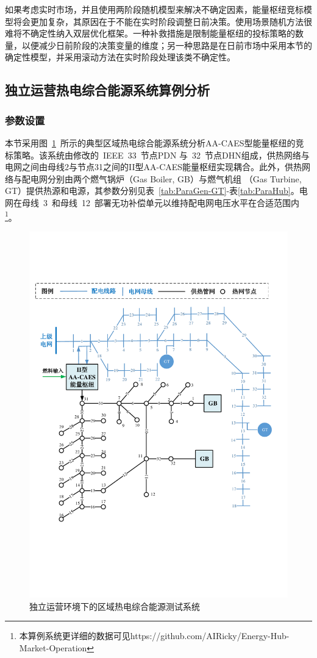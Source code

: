 如果考虑实时市场，并且使用两阶段随机模型来解决不确定因素，能量枢纽竞标模型将会更加复杂，其原因在于不能在实时阶段调整日前决策。使用场景随机方法很难将不确定性纳入双层优化框架。一种补救措施是限制能量枢纽的投标策略的数量，以便减少日前阶段的决策变量的维度；另一种思路是在日前市场中采用本节的确定性模型，并采用滚动方法在实时阶段处理该类不确定性。

\subsection{独立运营热电综合能源系统算例分析}
\subsubsection{参数设置}
本节采用图~\ref{Fig:Chap4-EH-PDN-DHN-CN}~所示的典型区域热电综合能源系统分析AA-CAES型能量枢纽的竞标策略。该系统由修改的~IEEE~33~节点PDN 与~32~节点DHN组成，供热网络与电网之间由母线2与节点31之间的II型AA-CAES能量枢纽实现耦合。此外，供热网络与配电网分别由两个燃气锅炉（Gas Boiler, GB）与燃气机组 （Gas Turbine, GT）提供热源和电源，其参数分别见表~\ref{tab:ParaGen-GT}-表\ref{tab:ParaHub}。电网在母线~3~和母线~12~部署无功补偿单元以维持配电网电压水平在合适范围内
\footnote{本算例系统更详细的数据可见https://github.com/AIRicky/Energy-Hub-Market-Operation}。

\begin{figure}[!htp]
\centering
\includegraphics[scale=0.60]{figures/Chap4-10-EH-PDN-DHN-CN-V2.pdf}
\caption{独立运营环境下的区域热电综合能源测试系统}
\label{Fig:Chap4-EH-PDN-DHN-CN}
\end{figure}

